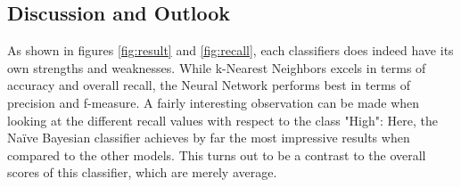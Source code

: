 

\subsection{Discussion and Outlook}

As shown in figures \ref{fig:result} and \ref{fig:recall}, each
classifiers does indeed have its own strengths and weaknesses.
While k-Nearest Neighbors excels in terms of accuracy and overall
recall, the Neural Network performs best in terms of precision and
f-measure. A fairly interesting observation can be made when looking
at the different recall values with respect to the class "High":
Here, the Na\"ive Bayesian classifier achieves by far the most impressive
results when compared to the other models. This turns out to be a
contrast to the overall scores of this classifier, which are merely average.

